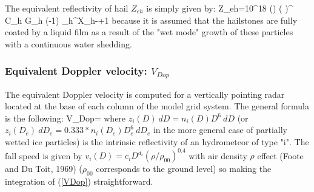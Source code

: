 The equivalent reflectivity of hail $Z_{eh}$ is simply given by:
%
\beq\label{Zehfin}
Z_{eh}=10^{18}  \Big(\Big)
\Big( \Big)^{} C_h G_h
\Big(-1\Big) \lambda_h^{X_h-{}+1}
\eeq
%
\noindent because it is assumed that the hailstones are fully coated by a
liquid film as a result of the "wet mode" growth of these particles with 
a continuous water shedding. 

%
\subsubsection{Equivalent Doppler velocity: $V_{Dop}$}
%
The equivalent Doppler velocity is computed for a vertically pointing radar 
located at the base of each column of the model grid system. The general formula
is the following:
%
\beq\label{VDop}
V_{Dop}=
\eeq
%
\noindent where $z_i(D)\ dD=n_i(D) D^6\ dD$ 
(or $z_i(D_e)\ dD_e=0.333*n_i(D_e) D_e^6\ dD_e$
in the more general case of partially wetted ice particles) is the intrinsic 
reflectivity of an hydrometeor of type "i". The fall speed is given by 
$v_i(D)=c_i D^{d_i} (\rho/\rho_{00})^{0.4}$ with air density $\rho$ effect
(Foote and Du Toit, 1969) ($\rho_{00}$ corresponds to the ground level) so 
making the integration of (\ref{VDop}) straightforward.

%
